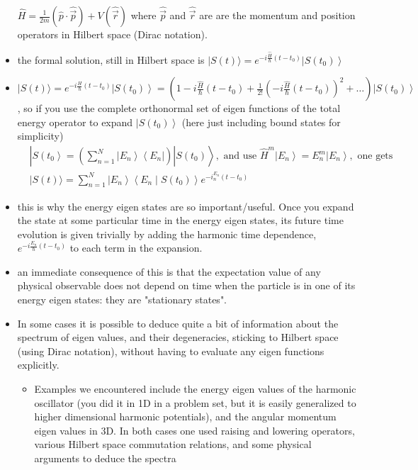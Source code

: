 \documentclass{article}
\begin{document}
\begin{itemize}
$\widehat{H}=\frac{1}{2 m}(\hat{p} \cdot \hat{\vec{p}})+V(\hat{\vec{r}})$ where $\hat{\vec{p}}$ and $\hat{\vec{r}}$ are are the momentum and position operators in Hilbert space (Dirac notation).
    \item the formal solution, still in Hilbert space is $|S(t)\rangle=e^{-i \frac{\hat{H}}{\hbar}\left(t-t_{0}\right)}\left|S\left(t_{0}\right)\right\rangle$
    
    \item $|S(t)\rangle=e^{-i \frac{H}{\hbar}\left(t-t_{0}\right)}\left|S\left(t_{0}\right)\right\rangle=\left(1-i \frac{\widehat{H}}{\hbar}\left(t-t_{0}\right)+\frac{1}{2 !}\left(-i \frac{\widehat{H}}{\hbar}\left(t-t_{0}\right)\right)^{2}+\ldots\right)\left|S\left(t_{0}\right)\right\rangle$, so if you use the complete orthonormal set of eigen functions of the total energy operator to expand $\left|S\left(t_{0}\right)\right\rangle$ (here just including bound states for simplicity)
$$
\begin{aligned}
&\left.\left|S\left(t_{0}\right\rangle=\left(\sum_{n=1}^{N}\left|E_{n}\right\rangle\left\langle E_{n}\right|\right)\right| S\left(t_{0}\right)\right\rangle, \text { and use } \widehat{H}^{m}\left|E_{n}\right\rangle=E_{n}^{m}\left|E_{n}\right\rangle, \text { one gets } \\
&|S(t)\rangle=\sum_{n=1}^{N}\left|E_{n}\right\rangle\left\langle E_{n} \mid S\left(t_{0}\right)\right\rangle e^{-i_{n}^{E_{n}}\left(t-t_{0}\right)}
\end{aligned}
$$
    \item this is why the energy eigen states are so important/useful. Once you expand the state at some particular time in the energy eigen states, its future time evolution is given trivially by adding the harmonic time dependence, $e^{-i \frac{E_{n}}{\hbar}\left(t-t_{0}\right)}$ to each term in the expansion.
    \item an immediate consequence of this is that the expectation value of any physical observable does not depend on time when the particle is in one of its energy eigen states: they are "stationary states".
    
    \item In some cases it is possible to deduce quite a bit of information about the spectrum of eigen values, and their degeneracies, sticking to Hilbert space (using Dirac notation), without having to evaluate any eigen functions explicitly.
    \begin{itemize}
        \item Examples we encountered include the energy eigen values of the harmonic oscillator (you did it in 1D in a problem set, but it is easily generalized to higher dimensional harmonic potentials), and the angular momentum eigen values in 3D.  In both cases one used raising and lowering operators, various Hilbert space commutation relations, and some physical arguments to deduce the spectra
    \end{itemize}


\end{itemize}
\end{document}
